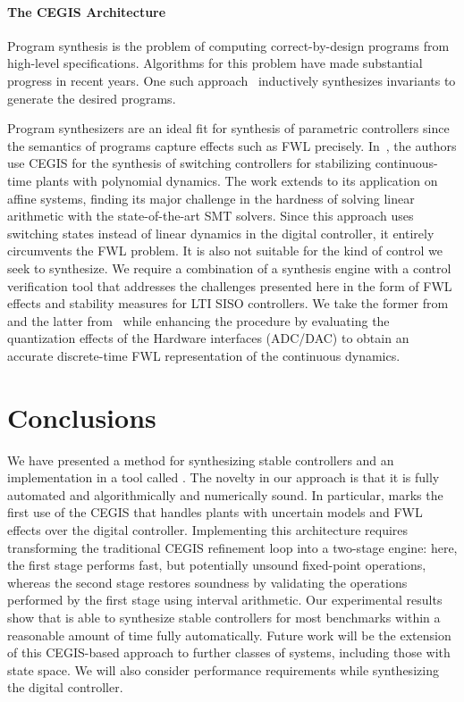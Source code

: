 \documentclass[final]{sig-alternate-05-2015}
\begin{document}
\paragraph{The CEGIS Architecture}

Program synthesis is the problem of computing correct-by-design programs
from high-level specifications. Algorithms for this problem have made
substantial progress in recent years.  One such
approach~\cite{itzhaky2010simple} inductively synthesizes invariants to
generate the desired programs.

Program synthesizers are an ideal fit for synthesis of parametric
controllers since the semantics of programs capture effects such as FWL
precisely.  In~\cite{DBLP:conf/cdc/RavanbakhshS15}, the authors use CEGIS
for the synthesis of switching controllers for stabilizing continuous-time
plants with polynomial dynamics.  The work extends to its application on
affine systems, finding its major challenge in the hardness of solving
linear arithmetic with the state-of-the-art SMT solvers.  Since this
approach uses switching states instead of linear dynamics in the digital
controller, it entirely circumvents the FWL problem.  It is also not
suitable for the kind of control we seek to synthesize.  We require a
combination of a synthesis engine with a control verification tool that
addresses the challenges presented here in the form of FWL effects and
stability measures for LTI SISO controllers.  We take the former
from~\cite{DBLP:conf/lpar/DavidKL15} and the latter from~\cite{daes20161}
while enhancing the procedure by evaluating the quantization effects of the
Hardware interfaces (ADC/DAC) to obtain an accurate discrete-time FWL
representation of the continuous dynamics.
 
\section{Conclusions}\label{sec:conclusions}

We have presented a method for synthesizing stable controllers and an
implementation in a tool called \tool.  The novelty in our approach is that
it is fully automated and algorithmically and numerically sound.  In
particular, \tool marks the first use of the CEGIS that handles plants with
uncertain models and FWL effects over the digital controller.  Implementing
this architecture requires transforming the traditional CEGIS refinement
loop into a two-stage engine: here, the first stage performs fast, but
potentially unsound fixed-point operations, whereas the second stage
restores soundness by validating the operations performed by the first stage
using interval arithmetic.  Our experimental results show that \tool is able
to synthesize stable controllers for most benchmarks within a reasonable
amount of time fully automatically.  Future work will be the extension of
this CEGIS-based approach to further classes of systems, including those
with state space.  We will also consider performance requirements while
synthesizing the digital controller.


  
\end{document}
